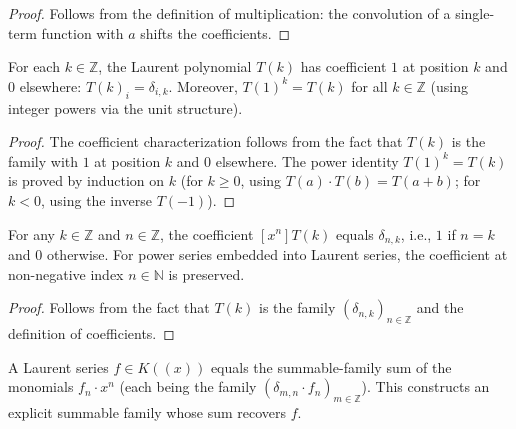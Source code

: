 \begin{proof}
\leanok
Follows from the definition of multiplication: the convolution
of a single-term function with $a$ shifts the coefficients.
\end{proof}

\begin{lemma}[Powers of $T$]
\label{lem.fps.laure.xk}
\leanhelper
\leanok
For each $k \in \mathbb{Z}$, the Laurent polynomial $T(k)$ has coefficient
$1$ at position $k$ and $0$ elsewhere:
$T(k)_i = \delta_{i,k}$.
Moreover, $T(1)^k = T(k)$ for all $k \in \mathbb{Z}$ (using integer powers
via the unit structure).
\end{lemma}

\begin{proof}
The coefficient characterization follows from the fact that $T(k)$ is
the family with $1$ at position $k$ and $0$ elsewhere.
The power identity $T(1)^k = T(k)$ is proved by induction on $k$
(for $k \geq 0$, using $T(a) \cdot T(b) = T(a+b)$; for $k < 0$,
using the inverse $T(-1)$).
\end{proof}

\begin{lemma}
\label{lem.fps.laure.xk.coeff}
\leanhelper
\leanok
For any $k \in \mathbb{Z}$ and $n \in \mathbb{Z}$, the coefficient
$[x^n] T(k)$ equals $\delta_{n,k}$, i.e., $1$ if $n = k$ and $0$ otherwise.
For power series embedded into Laurent series, the coefficient at
non-negative index $n \in \mathbb{N}$ is preserved.
\end{lemma}

\begin{proof}
\leanok
Follows from the fact that $T(k)$ is the family $(\delta_{n,k})_{n \in \mathbb{Z}}$
and the definition of coefficients.
\end{proof}

\begin{lemma}
\label{lem.fps.laure.xa.right}
\leanhelper
\leanok
A Laurent series $f \in K((x))$ equals the summable-family sum of the
monomials $f_n \cdot x^n$ (each being the family $(\delta_{m,n} \cdot f_n)_{m \in \mathbb{Z}}$).
This constructs an explicit summable family whose sum recovers $f$.
\end{lemma}

